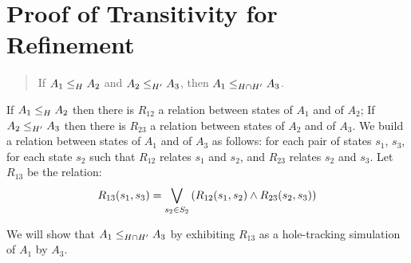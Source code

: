 \documentclass[runningheads]{llncs}
\begin{document}
 
 

\newpage

\appendix


\section{Proof of Transitivity for Refinement}\label{sec:proof-transitivity}
\begin{quote}
If $\wrel{A_1}{A_2}{H}$ and $\wrel{A_2}{A_3}{H'}$, then $\wrel{A_1}{A_3}{H\cap H'}$.
\end{quote}
\proof 
If $\wrel{A_1}{A_2}{H}$ then there is $R_{12}$ a relation between states
of $A_1$ and of $A_2$;  If $\wrel{A_2}{A_3}{H'}$ then there is $R_{23}$ a relation between states of $A_2$ and of $A_3$. We build a relation between
 states of $A_1$ and of $A_3$ as follows:  for each pair of states $s_1$, $s_3$, for each state $s_2$ such that $R_{12}$ relates $s_1$ and $s_2$, and $R_{23}$ relates $s_2$ and $s_3$.
Let $R_{13}$ be the relation:\\
  \[R_{13}(s_1,s_3)=\bigvee_{s_2\in S_2}\mpar{R_{12}(s_1,s_2) \land R_{23}(s_2,s_3) } \]

We will show that $\wrel{A_1}{A_3}{H\cap H'}$ by exhibiting  $R_{13}$ as a hole-tracking simulation of $A_1$ by  $A_3$.
\end{document}
